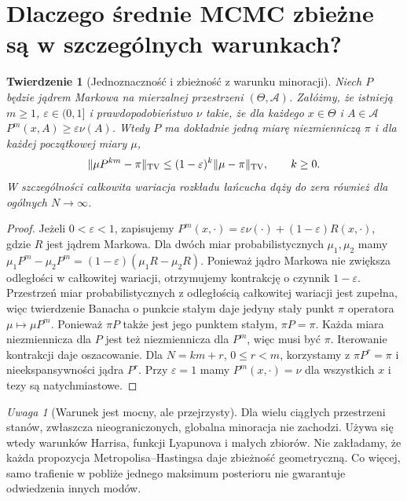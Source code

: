 \documentclass[11pt,a4paper,oneside]{report}
\numberwithin{equation}{chapter}
\theoremstyle{plain}
\newtheorem{twierdzenie}{Twierdzenie}[chapter]
\theoremstyle{definition}
\theoremstyle{remark}
\newtheorem{uwaga}{Uwaga}[chapter]
\newcommand{\norm}[1]{\lVert#1\rVert}
\begin{document}
\section{Dlaczego średnie MCMC zbieżne są w szczególnych warunkach?}
\begin{twierdzenie}[Jednoznaczność i zbieżność z warunku minoracji]
\label{thm:mcmc-minorization}
Niech $P$ będzie jądrem Markowa na mierzalnej przestrzeni
$(\Theta,\mathcal A)$. Załóżmy, że istnieją
$m\ge1$, $\varepsilon\in(0,1]$ i prawdopodobieństwo $\nu$
takie, że dla każdego $x\in\Theta$ i $A\in\mathcal A$
$P^m(x,A)\ge\varepsilon\nu(A)$.
Wtedy $P$ ma dokładnie jedną miarę niezmienniczą $\pi$
i dla każdej początkowej miary $\mu$,
\[
 \norm{\mu P^{km}-\pi}_{\rm TV}
 \le(1-\varepsilon)^k\norm{\mu-\pi}_{\rm TV},
 \qquad k\ge0.
\]
W szczególności całkowita wariacja rozkładu łańcucha
dąży do zera również dla ogólnych $N\to\infty$.
\end{twierdzenie}
\begin{proof}
Jeżeli $0<\varepsilon<1$, zapisujemy
$P^m(x,\cdot)=\varepsilon\nu(\cdot)
 +(1-\varepsilon)R(x,\cdot)$, gdzie $R$ jest jądrem
Markowa. Dla dwóch miar probabilistycznych $\mu_1,\mu_2$
mamy
$\mu_1P^m-\mu_2P^m=(1-\varepsilon)(\mu_1R-\mu_2R)$.
Ponieważ jądro Markowa nie zwiększa odległości
w całkowitej wariacji, otrzymujemy kontrakcję o czynnik
$1-\varepsilon$. Przestrzeń miar probabilistycznych
z odległością całkowitej wariacji jest zupełna,
więc twierdzenie Banacha o punkcie stałym daje
jedyny stały punkt $\pi$ operatora $\mu\mapsto\mu P^m$.
Ponieważ $\pi P$ także jest jego punktem stałym,
$\pi P=\pi$. Każda miara niezmiennicza dla $P$
jest też niezmiennicza dla $P^m$, więc musi być $\pi$.
Iterowanie kontrakcji daje oszacowanie.
Dla $N=km+r$, $0\le r<m$, korzystamy z
$\pi P^r=\pi$ i nieekspansywności jądra $P^r$.
Przy $\varepsilon=1$ mamy $P^m(x,\cdot)=\nu$
dla wszystkich $x$ i tezy są natychmiastowe.
\end{proof}

\begin{uwaga}[Warunek jest mocny, ale przejrzysty]
Dla wielu ciągłych przestrzeni stanów, zwłaszcza
nieograniczonych, globalna minoracja nie zachodzi.
Używa się wtedy warunków Harrisa, funkcji Lyapunova
i małych zbiorów. Nie zakładamy, że każda propozycja
Metropolisa--Hastingsa daje zbieżność geometryczną.
Co więcej, samo trafienie w pobliże jednego maksimum
posterioru nie gwarantuje odwiedzenia innych modów.
\end{uwaga}
\end{document}
